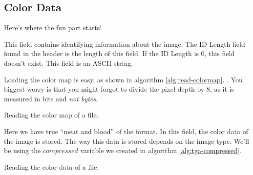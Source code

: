 \begin{refsection}
  \section{Color Data}
  \label{sec:color-data}

  Here's where the fun part starts!


  This field contains identifying information about the image. The
  ID Length field found in the header is the length of this field. If
  the ID Length is 0, this field doesn't exist. This field is an ASCII
  string.


  Loading the color map is easy, as shown in algorithm
  \ref{alg:read-colormap}. . You
  biggest worry is that you might forgot to divide the pixel depth by
  8, as it is measured in bits and \textit{not bytes}.

  \begin{algorithm}[H]
    \caption{Reading the color map of a \tga file.}
    \label{alg:read-colormap}
    \begin{algorithmic}[1]
      \State {}
      \EndFor
    \end{algorithmic}
  \end{algorithm}


  Here we have true ``meat and blood'' of the \tga format. In this
  field, the color data of the image is stored. The way this data is
  stored depends on the image type. We'll be using the $compressed$
  variable we created in algorithm \ref{alg:tga-compressed}.

  \begin{algorithm}[H]
    \caption{Reading the color data of a \tga file.}
    \label{alg:TGA-read-colordata}
    \newcommand{\process}{\State Process the color $data$ \dots}
    \begin{algorithmic}[1]



\end{algorithmic}
\end{algorithm}
\end{refsection}
